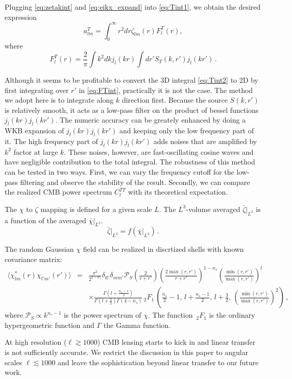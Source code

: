 Plugging \eqref{eq:zetakint} and \eqref{eq:eikx_expand} into \eqref{eq:Tint1}, we obtain the desired expression
\begin{equation}
a_{lm}^T = \int_0^\infty r^2dr \zeta_{lm}(r) F^T_l(r), \label{eq:Tint2}
\end{equation}
where
\begin{equation}
F^T_l(r) = \frac{2}{\pi} \int k^2dk j_l(kr) \int dr' S_T(k, r') j_l(kr') \, . \label{eq:FTint}
\end{equation}

Although it seems to be profitable to convert the 3D integral \eqref{eq:Tint2} to 2D by first integrating over $r'$ in \eqref{eq:FTint}, practically it is not the case. The method we adopt here is to integrate along $k$ direction first. Because the source $S(k, r')$ is relatively smooth, it acts as a low-pass filter on the product of bessel functions $j_l(kr)j_l(kr')$. The numeric accuracy can be greately enhanced by doing a WKB expansion of $j_l(kr)j_l(kr')$ and keeping only the low frequency part of it. The high frequency part of $j_l(kr)j_l(kr')$ adds noises that are amplified by $k^2$ factor at large $k$. These noises, however, are fast-oscillating cosine waves and have negligible contribution to the total integral. The robustness of this method can be tested in two ways. First, we can vary the frequency cutoff for the low-pass filtering and observe the stability of the result. Secondly, we can compare the realized CMB power spectrum $C_l^{TT}$ with its theoretical expectation. 

The $\chi$ to $\zeta$ mapping is defined for a given scale $L$. The $L^3$-volume averaged $\bar{\zeta}|_{L^3}$ is a function of the averaged $\bar{\chi}|_{L^3}$.
\begin{equation}
\bar{\zeta}\vert_{L^3}  = f\left(\bar{\chi}\vert_{L^3}\right)\, .
\end{equation}

The random Gaussian $\chi$ field can be realized in discrtized shells with known covariance matrix:
\begin{eqnarray}
  \langle \chi^*_{lm}(r) \chi_{l'm'}(r')\rangle &=& \frac{\pi^2}{2^{2-n_s}}  \delta_{ll'}\delta_{mm'} \mathcal{P}_S\left(\frac{2}{r+r'}\right) \left(\frac{2\max(r,r')}{r+r'}\right)^{1-n_s} \left(\frac{\min(r, r')}{\max(r,r')}\right)^l  \nonumber \\
 &&  \times \frac{\Gamma\left(l+\frac{n_s-1}{2}\right)}{\Gamma\left(l+\frac{3}{2}\right)\Gamma\left(4-n_s\right)} {\,_2F_1\,}\left( \frac{n_s}{2}-1,\, l+\frac{n_s-1}{2},\, l+ \frac{3}{2},\, \left(\frac{\min(r, r')}{\max(r,r')}\right)^2\right)   \, ,
\end{eqnarray}
where $\mathcal{P}_S \propto k^{n_s-1}$ is the power spectrum of $\chi$.  The function $\,_2F_1$ is the ordinary hypergeometric function and $\Gamma$ the Gamma function.

At high resolution ($\ell \gtrsim 1000$) CMB lensing starts to kick in and linear transfer is not sufficiently accurate. We restrict the discussion in this paper to angular scales $\ell \lesssim 1000$ and leave the sophistication beyond linear transfer to our future work.


